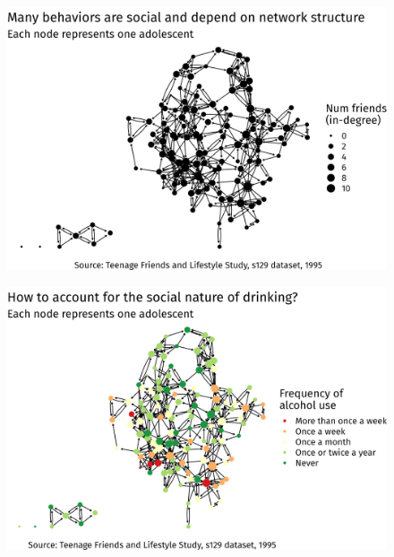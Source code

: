 \documentclass{beamer}
\theoremstyle{remark}
\begin{document}
\begin{frame}
    \centering
    \vspace{3mm}
    \begin{figure}
        \includegraphics[width=\textwidth]{figures/glasgow-degree.png}
    \end{figure}

\end{frame}

\begin{frame}
    \centering
    \vspace{3mm}
    \begin{figure}
        \includegraphics[width=\textwidth]{figures/glasgow-alcohol.png}
    \end{figure}
\end{frame}
\end{document}
